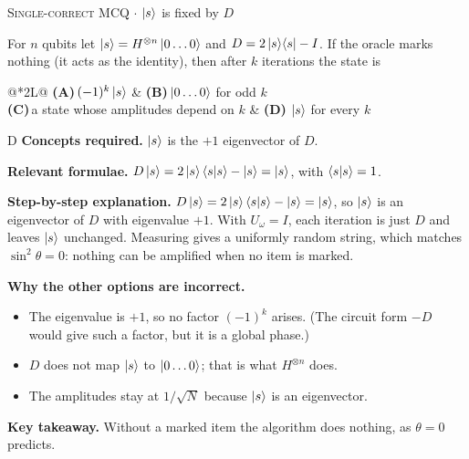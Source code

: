 \documentclass[11pt,a4paper]{article}
\newcommand{\optlabel}[1]{\textbf{(#1)}}
\newcommand{\correctlabel}[1]{\textcolor{okgreen}{\textbf{(#1)}\,\ding{51}}}
\newenvironment{qitem}[1]{\begin{list}{}{\setlength{\leftmargin}{3.3em}\setlength{\labelwidth}{3.1em}%
  \setlength{\labelsep}{0.2em}\setlength{\topsep}{3pt}\setlength{\parsep}{3pt}}\item[\textbf{Q.#1}\hfill]}{\end{list}}
\newcommand{\qsep}{\par\vspace{2pt}{\color{black!15}\hrule}\vspace{4pt}}
\newcommand{\qmeta}[2]{{\footnotesize\color{black!60}\textsc{#1} \;$\cdot$\; #2}\par}
\begin{document}
\begin{qitem}{34}
\qmeta{Single-correct MCQ}{$\ket{s}$ is fixed by $D$}
For $n$ qubits let $\ket{s} = H^{\otimes n}\ket{0\dots0}$ and $D = 2\ket{s}\!\bra{s} - I$. If the oracle marks nothing (it acts as the identity), then after $k$ iterations the state is
\par\smallskip\noindent\begin{tabularx}{\linewidth}{@{}*{2}{L}@{}}
\optlabel{A}\,$(-1)^k\ket{s}$ & \optlabel{B}\,$\ket{0\dots0}$ for odd $k$ \\[3pt]
\optlabel{C}\,a state whose amplitudes depend on $k$ & \correctlabel{D}\,$\ket{s}$ for every $k$
\end{tabularx}
\end{qitem}
\begin{solbox}{D}
\textbf{\color{brand}Concepts required.} $\ket{s}$ is the $+1$ eigenvector of $D$.

\textbf{\color{brand}Relevant formulae.} $D\ket{s} = 2\ket{s}\braket{s|s} - \ket{s} = \ket{s}$, with $\braket{s|s} = 1$.

\textbf{\color{brand}Step-by-step explanation.} $D\ket{s} = 2\ket{s}\braket{s|s} - \ket{s} = \ket{s}$, so $\ket{s}$ is an eigenvector of $D$ with eigenvalue $+1$. With $U_\omega = I$, each iteration is just $D$ and leaves $\ket{s}$ unchanged.
Measuring gives a uniformly random string, which matches $\sin^2\theta = 0$: nothing can be amplified when no item is marked.

\textbf{\color{brand}Why the other options are incorrect.}
\begin{itemize}[leftmargin=2.4em, itemsep=1pt, topsep=2pt]
\item[\textbf{(A)}] The eigenvalue is $+1$, so no factor $(-1)^k$ arises. (The circuit form $-D$ would give such a factor, but it is a global phase.)
\item[\textbf{(B)}] $D$ does not map $\ket{s}$ to $\ket{0\dots0}$; that is what $H^{\otimes n}$ does.
\item[\textbf{(C)}] The amplitudes stay at $1/\sqrt N$ because $\ket{s}$ is an eigenvector.
\end{itemize}
\textbf{\color{brand}Key takeaway.} Without a marked item the algorithm does nothing, as $\theta = 0$ predicts.
\end{solbox}
\qsep
\end{document}
